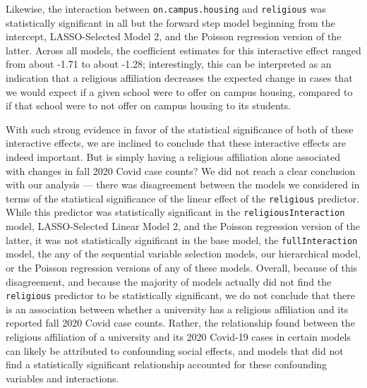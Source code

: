 \documentclass[
]{article}
\begin{document}
Likewise, the interaction between \texttt{on.campus.housing} and
\texttt{religious} was statistically significant in all but the forward
step model beginning from the intercept, LASSO-Selected Model 2, and the
Poisson regression version of the latter. Across all models, the
coefficient estimates for this interactive effect ranged from about
-1.71 to about -1.28; interestingly, this can be interpreted as an
indication that a religious affiliation decreases the expected change in
cases that we would expect if a given school were to offer on campus
housing, compared to if that school were to not offer on campus housing
to its students.

With such strong evidence in favor of the statistical significance of
both of these interactive effects, we are inclined to conclude that
these interactive effects are indeed important. But is simply having a
religious affiliation alone associated with changes in fall 2020 Covid
case counts? We did not reach a clear conclusion with our analysis ---
there was disagreement between the models we considered in terms of the
statistical significance of the linear effect of the \texttt{religious}
predictor. While this predictor was statistically significant in the
\texttt{religiousInteraction} model, LASSO-Selected Linear Model 2, and
the Poisson regression version of the latter, it was not statistically
significant in the base model, the \texttt{fullInteraction} model, the
any of the sequential variable selection models, our hierarchical model,
or the Poisson regression versions of any of these models. Overall,
because of this disagreement, and because the majority of models
actually did not find the \texttt{religious} predictor to be
statistically significant, we do not conclude that there is an
association between whether a university has a religious affiliation and
its reported fall 2020 Covid case counts. Rather, the relationship found
between the religious affiliation of a university and its 2020 Covid-19
cases in certain models can likely be attributed to confounding social
effects, and models that did not find a statistically significant
relationship accounted for these confounding variables and interactions.
\end{document}
